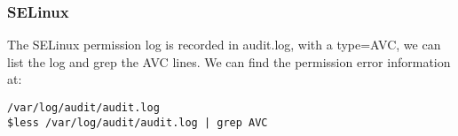 \documentclass{article}
\newcommand{\MySubFigureTwo}[8]
{
    \vspace{#5}
    \begin{figure}[H]
    \centering
    \subfigure[#3]
    {
        \texttt{[image: \#1]}
        \label{fig:a#7}
    }
    \subfigure[#4]
    {
        \texttt{[image: \#2]}
        \label{fig:b#7}
    }
    \caption[#6]{#6}
    \label{fig:#7}
    \end{figure}
}
\begin{document}
\subsubsection{SELinux}
The SELinux permission log is recorded in audit.log, with a type=AVC, we can list the log and grep the AVC lines.
We can find the permission error information at:
\begin{lstlisting}
/var/log/audit/audit.log
$less /var/log/audit/audit.log | grep AVC
\end{lstlisting}


\end{document}
